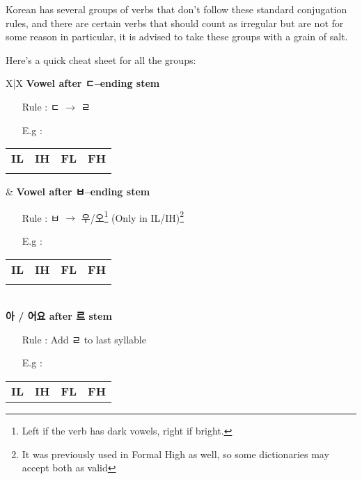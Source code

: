 Korean has several groups of verbs that don't follow these standard conjugation rules, and there are certain verbs that should count as irregular but are not for some reason in particular, it is advised to take these groups with a grain of salt.

Here's a quick cheat sheet for all the groups:

\begin{tabularx}{\linewidth}{X|X}
    \textbf{Vowel after ㄷ--ending stem}
        \begin{itemize}
            \item [Rule]: ㄷ $\rightarrow$ ㄹ
            \item [E.g]: 
        \end{itemize}
        \begin{tabular}{c|c|c|c}
            \textbf{IL} & \textbf{IH} & \textbf{FL} & \textbf{FH} \\
            \rom{걸어}{geoleo} & \rom{걸어요}{geoleoyo} & \rom{걷는다}{geodneunda} & \rom{걷습니다}{geodseubnida} 
        \end{tabular}
    & \textbf{Vowel after ㅂ--ending stem}
        \begin{itemize}
            \item [Rule]: ㅂ $\rightarrow$ 우/오\footnote{Left if the verb has dark vowels, right if bright.} (Only in IL/IH)\footnote{It was previously used in Formal High as well, so some dictionaries may accept both as valid}
            \item [E.g]: 
        \end{itemize}
        \begin{tabular}{c|c|c|c}
            \textbf{IL} & \textbf{IH} & \textbf{FL} & \textbf{FH} \\
            \rom{도와}{dowa} & \rom{도와요}{dowayo} & \rom{돕는다}{dobneunda} & \rom{돕습니다}{dobseubnida} 
        \end{tabular}
    \\ \hline
    \textbf{아 / 어요 after 르 stem}
        \begin{itemize}
            \item [Rule]: Add ㄹ to last syllable
            \item [E.g]: 
        \end{itemize}
        \begin{tabular}{c|c|c|c}
            \textbf{IL} & \textbf{IH} & \textbf{FL} & \textbf{FH} \\

\end{tabular}
\end{tabularx}
